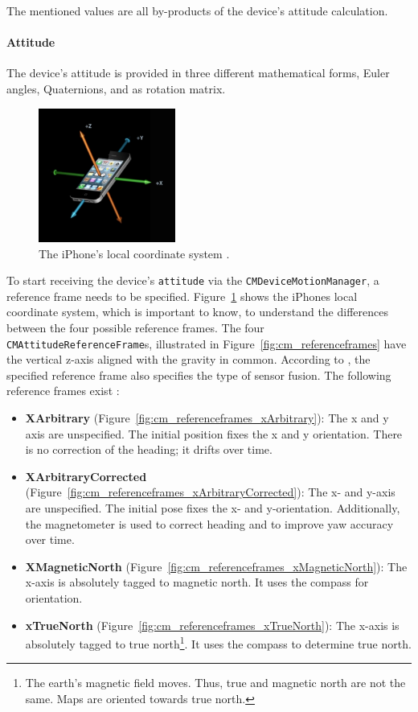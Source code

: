 \noindent The mentioned values are all by-products of the device's attitude calculation.

\paragraph{Attitude} The device's attitude is provided in three different mathematical forms, Euler angles, Quaternions, and as rotation matrix.

\begin{figure}
	\includegraphics[width=0.4\textwidth]{figures/iphone_coordinatesystem}
	\caption{The iPhone's local coordinate system \citep{apple:wwdc_2012_pham}.}
	\label{fig:iphone_cs}
\end{figure}

To start receiving the device's \texttt{attitude} via the \texttt{CMDeviceMotionManager}, a reference frame needs to be specified. Figure~\ref{fig:iphone_cs} shows the iPhones local coordinate system, which is important to know, to understand the differences between the four possible reference frames. The four \texttt{CMAttitudeReferenceFrame}s, illustrated in Figure~\ref{fig:cm_referenceframes} have the vertical z-axis aligned with the gravity in common. According to \citet{apple:wwdc_2014_pham}, the specified reference frame also specifies the type of sensor fusion. The following reference frames exist \citep{apple:wwdc_2014_pham,apple:ios_doc_cm}:
\begin{itemize}
  \item \textbf{XArbitrary} (Figure~\ref{fig:cm_referenceframes_xArbitrary}): The x and y axis are unspecified. The initial position fixes the x and y orientation. There is no correction of the heading; it drifts over time.
  \item \textbf{XArbitraryCorrected} (Figure~\ref{fig:cm_referenceframes_xArbitraryCorrected}): The x- and y-axis are unspecified. The initial pose fixes the x- and y-orientation. Additionally, the magnetometer is used to correct heading and to improve yaw accuracy over time.
  \item \textbf{XMagneticNorth} (Figure~\ref{fig:cm_referenceframes_xMagneticNorth}): The x-axis is absolutely tagged to magnetic north. It uses the compass for orientation.
  \item \textbf{xTrueNorth} (Figure~\ref{fig:cm_referenceframes_xTrueNorth}): The x-axis is absolutely tagged to true north\footnote{The earth's magnetic field moves. Thus, true and magnetic north are not the same. Maps are oriented towards true north.}. It uses the compass to determine true north.
\end{itemize}

